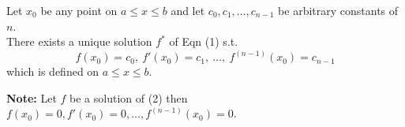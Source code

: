 \documentclass[11pt,a4paper]{article}
\begin{document}
Let $x_0$ be any point on $a \leq x \leq b$ and let $c_0, c_1, \dots, c_{n-1}$ be arbitrary constants of $n$. \\
There exists a unique solution $f^*$ of Eqn (1) s.t.
\[ f(x_0) = c_0, \ f'(x_0) = c_1, \ \dots, \ f^{(n-1)}(x_0) = c_{n-1} \]
which is defined on $a \leq x \leq b$.

\textbf{Note:} Let $f$ be a solution of (2) then $f(x_0) = 0, f'(x_0) = 0, \dots, f^{(n-1)}(x_0) = 0$.
\end{document}
